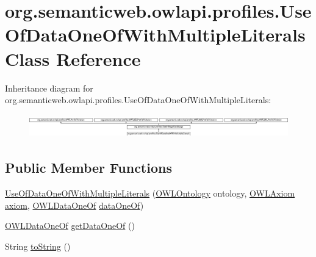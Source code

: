 \hypertarget{classorg_1_1semanticweb_1_1owlapi_1_1profiles_1_1_use_of_data_one_of_with_multiple_literals}{\section{org.\-semanticweb.\-owlapi.\-profiles.\-Use\-Of\-Data\-One\-Of\-With\-Multiple\-Literals Class Reference}
\label{classorg_1_1semanticweb_1_1owlapi_1_1profiles_1_1_use_of_data_one_of_with_multiple_literals}
}
Inheritance diagram for org.\-semanticweb.\-owlapi.\-profiles.\-Use\-Of\-Data\-One\-Of\-With\-Multiple\-Literals\-:\begin{figure}[H]
\begin{center}
\leavevmode
\includegraphics[height=1.016949cm]{classorg_1_1semanticweb_1_1owlapi_1_1profiles_1_1_use_of_data_one_of_with_multiple_literals}
\end{center}
\end{figure}
\subsection*{Public Member Functions}
\begin{DoxyCompactItemize}
\item 
\hyperlink{classorg_1_1semanticweb_1_1owlapi_1_1profiles_1_1_use_of_data_one_of_with_multiple_literals_a4f27a8bf5b76bc2685e0acfdd4bb1517}{Use\-Of\-Data\-One\-Of\-With\-Multiple\-Literals} (\hyperlink{interfaceorg_1_1semanticweb_1_1owlapi_1_1model_1_1_o_w_l_ontology}{O\-W\-L\-Ontology} ontology, \hyperlink{interfaceorg_1_1semanticweb_1_1owlapi_1_1model_1_1_o_w_l_axiom}{O\-W\-L\-Axiom} \hyperlink{classorg_1_1semanticweb_1_1owlapi_1_1profiles_1_1_o_w_l_profile_violation_aa7c8e8910ed3966f64a2c003fb516214}{axiom}, \hyperlink{interfaceorg_1_1semanticweb_1_1owlapi_1_1model_1_1_o_w_l_data_one_of}{O\-W\-L\-Data\-One\-Of} \hyperlink{classorg_1_1semanticweb_1_1owlapi_1_1profiles_1_1_use_of_data_one_of_with_multiple_literals_a01f6608663d31efed21fe838724acfa3}{data\-One\-Of})
\item 
\hyperlink{interfaceorg_1_1semanticweb_1_1owlapi_1_1model_1_1_o_w_l_data_one_of}{O\-W\-L\-Data\-One\-Of} \hyperlink{classorg_1_1semanticweb_1_1owlapi_1_1profiles_1_1_use_of_data_one_of_with_multiple_literals_a9b47cff983418adb0a85f51c1395b7f8}{get\-Data\-One\-Of} ()
\item 
String \hyperlink{classorg_1_1semanticweb_1_1owlapi_1_1profiles_1_1_use_of_data_one_of_with_multiple_literals_a17c7f320be10c8858c44e2b25c76e539}{to\-String} ()
\end{DoxyCompactItemize}
